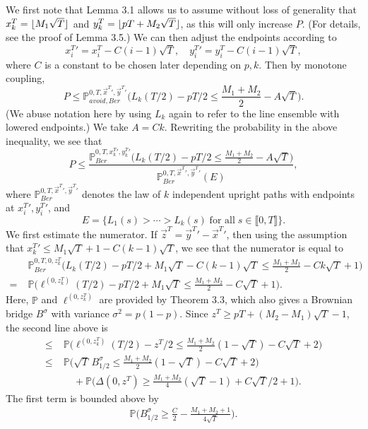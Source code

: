 \documentclass[12pt]{article}
\DeclarePairedDelimiter\floor{\lfloor}{\rfloor}
\begin{document}
	We first note that Lemma 3.1 allows us to assume without loss of generality that $x_k^T = \floor{M_1\sqrt{T}}$ and $y_k^T = \floor{pT + M_2\sqrt{T}}$, as this will only increase $P$. (For details, see the proof of Lemma 3.5.) We can then adjust the endpoints according to
	\[
	x_i^T{}' = x_i^T - C(i-1)\sqrt{T}, \quad y_i^T{}' = y_i^T - C(i-1)\sqrt{T},
	\]
	where $C$ is a constant to be chosen later depending on $p,k$. Then by monotone coupling,
	\[
	P \leq \mathbb{P}^{0,T,\vec{x}^T{}',\vec{y}^T{}'}_{avoid, Ber} \Big( L_k(T/2) - pT/2 \leq \frac{M_1+M_2}{2} - A\sqrt{T} \Big).
	\]
	(We abuse notation here by using $L_k$ again to refer to the line ensemble with lowered endpoints.) We take $A = Ck$. Rewriting the probability in the above inequality, we see that
	\[
	P \leq \frac{\mathbb{P}^{0,T,x_k^T{}',y_k^T{}'}_{Ber} \Big( L_k(T/2) - pT/2 \leq \frac{M_1+M_2}{2} - A\sqrt{T} \Big)}{\mathbb{P}^{0,T,\vec{x}^T{}',\vec{y}^T{}'}_{Ber}(E)},
	\]
	where $\mathbb{P}^{0,T,\vec{x}^T{}',\vec{y}^T{}'}_{Ber}$ denotes the law of $k$ independent upright paths with endpoints at $x_i^T{}', y_i^T{}'$, and
	\[
	E = \{L_1(s) > \cdots > L_k(s)\;\textrm{for all}\;s \in \llbracket 0, T\rrbracket \}.
	\]
	We first estimate the numerator. If $\vec{z}^T = \vec{y}^T{}' - \vec{x}^T{}'$, then using the assumption that $x_k^T{}' \leq M_1\sqrt{T} + 1 - C(k-1)\sqrt{T}$, we see that the numerator is equal to
	\begin{align*}
	&\mathbb{P}^{0,T,0,z_k^T}_{Ber} \Big( L_k(T/2) - pT/2 + M_1\sqrt{T} - C(k-1)\sqrt{T} \leq \frac{M_1+M_2}{2} - Ck\sqrt{T} + 1\Big) \\
	= \; & \mathbb{P} \Big( \ell^{(0,z^T_k)}(T/2) - pT/2 + M_1\sqrt{T} \leq \frac{M_1+M_2}{2} - C\sqrt{T} + 1\Big).
	\end{align*}
	Here, $\mathbb{P}$ and $\ell^{(0,z_k^T)}$ are provided by Theorem 3.3, which also gives a Brownian bridge $B^{\sigma}$ with variance $\sigma^2 = p(1-p)$. Since $z^T \geq pT + (M_2 - M_1)\sqrt{T} - 1$, the second line above is
	\begin{align*}
	\leq \; & \mathbb{P} \Big( \ell^{(0,z^T_k)}(T/2) - z^T/2 \leq \frac{M_1+M_2}{2}(1-\sqrt{T}) - C\sqrt{T} + 2\Big)\\
	\leq \; & \mathbb{P} \Big( \sqrt{T}\,B^{\sigma}_{1/2} \leq \frac{M_1+M_2}{2}(1-\sqrt{T}) - C\sqrt{T} + 2\Big)\\
	&\quad + \mathbb{P}\Big(\Delta(0,z^T) \geq \frac{M_1+M_2}{4}(\sqrt{T}-1) + C\sqrt{T}/2 + 1\Big).
	\end{align*}
	The first term is bounded above by
	\begin{align*}
	\mathbb{P} \Big( B^{\sigma}_{1/2} \geq  \frac{C}{2} - \frac{M_1 + M_2 + 1}{4\sqrt{T}}\Big).
	\end{align*}
\end{document}
